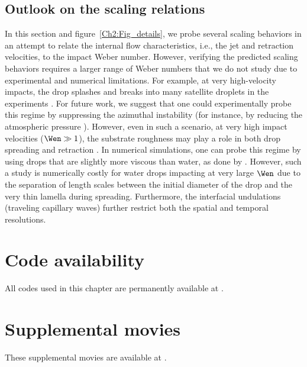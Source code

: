 \begin{subappendices}
	\subsection{Outlook on the scaling relations} 
	
	In this section and figure~\ref{Ch2:Fig_details}, we probe several scaling behaviors in an attempt to relate the internal flow characteristics, i.e., the jet and retraction velocities, to the impact Weber number. However, verifying the predicted scaling behaviors requires a larger range of Weber numbers that we do not study due to experimental and numerical limitations. For example, at very high-velocity impacts, the drop splashes and breaks into many satellite droplets in the experiments \cite{riboux2014experiments}. For future work, we suggest that one could experimentally probe this regime by suppressing the azimuthal instability (for instance, by reducing the atmospheric pressure \cite{xu2005drop}). However, even in such a scenario, at very high impact velocities ($\Wen \gg 1$), the substrate roughness may play a role in both drop spreading and retraction \cite{visser2015dynamics}. In numerical simulations, one can probe this regime by using drops that are slightly more viscous than water, as done by \citet{eggers2010drop}. However, such a study is numerically costly for water drops impacting at very large $\Wen$ due to the separation of length scales between the initial diameter of the drop and the very thin lamella during spreading. Furthermore, the interfacial undulations (traveling capillary waves) further restrict both the spatial and temporal resolutions.
	
	\section{Code availability}
	
	All codes used in this chapter are permanently available at \citet{basiliskvatsaltwopeaks}.
	
	\section{Supplemental movies}
	These supplemental movies are available at \citet[\href{https://youtube.com/playlist?list=PLf5C5HCrvhLGmlYTF1Gg2WviZ-Bkmy2qr}{external YouTube link,}][]{vatsalDropForcessuppl}. 
	

\end{subappendices}
